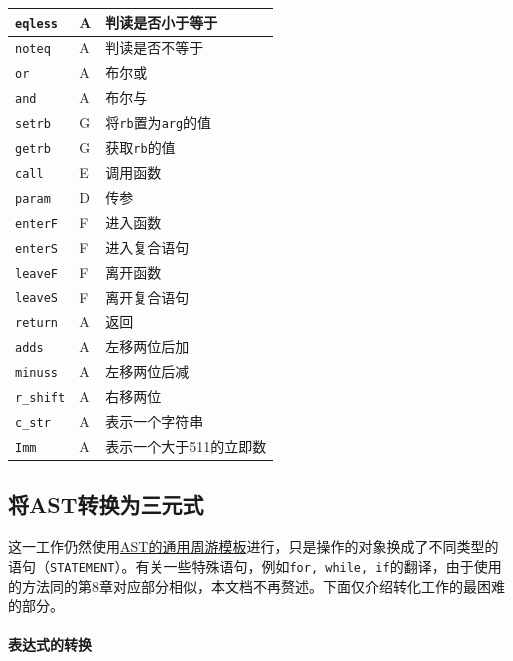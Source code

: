 \begin{center}
\begin{minipage}{0.48\textwidth}
\begin{flushright}
\begin{tabular}{|l|l|l|}
	\hline
		\verb|eqless| & A & 判读是否小于等于\\
	\hline 
		\verb|noteq| & A & 判读是否不等于\\
	\hline 
		\verb|or| & A & 布尔或\\
	\hline 
		\verb|and| & A & 布尔与\\
	\hline 
		\verb|setrb| & G & 将\verb|rb|置为\verb|arg|的值\\
	\hline 
		\verb|getrb| & G & 获取\verb|rb|的值\\
	\hline 
		\verb|call| & E & 调用函数\\
	\hline 
		\verb|param| & D & 传参\\
	\hline 
		\verb|enterF| & F & 进入函数\\
	\hline 
		\verb|enterS| & F & 进入复合语句\\
	\hline 
		\verb|leaveF| & F & 离开函数\\
	\hline 
		\verb|leaveS| & F & 离开复合语句\\
	\hline 
		\verb|return| & A & 返回\\
	\hline
		\verb|adds| & A & 左移两位后加\\
	\hline
		\verb|minuss| & A & 左移两位后减\\
	\hline 
		\verb|r_shift| & A & 右移两位\\
	\hline 
		\verb|c_str| & A & 表示一个字符串\\
	\hline
		\verb|Imm| & A & 表示一个大于511的立即数\\
	\hline
	\end{tabular}
\end{flushright}
\end{minipage}
\end{center}
\subsection{将AST转换为三元式}
这一工作仍然使用\hyperref[ASTtravesal]{AST的通用周游模板}进行，只是操作的对象换成了不同类型的语句（\verb|STATEMENT|）。有关一些特殊语句，例如\verb|for, while, if|的翻译，由于使用的方法同\cite{sunjiasu}的第8章对应部分相似，本文档不再赘述。下面仅介绍转化工作的最困难的部分。
\paragraph*{表达式的转换}
\label{ASTtotriple}
